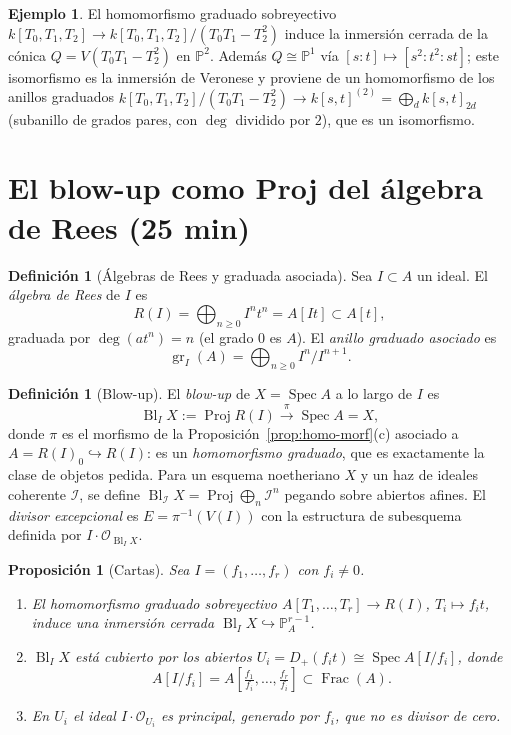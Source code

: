 \documentclass[11pt,a4paper]{article}
\newcommand{\Spec}{\operatorname{Spec}}
\newcommand{\Proj}{\operatorname{Proj}}
\newcommand{\Bl}{\operatorname{Bl}}
\newcommand{\gr}{\operatorname{gr}}
\newcommand{\PP}{\mathbb{P}}
\newcommand{\cO}{\mathcal{O}}
\newcommand{\Frac}{\operatorname{Frac}}
\theoremstyle{plain}
\newtheorem{proposicion}[teorema]{Proposición}
\theoremstyle{definition}
\newtheorem{definicion}[teorema]{Definición}
\newtheorem{ejemplo}[teorema]{Ejemplo}
\theoremstyle{remark}
\begin{document}
\begin{ejemplo}
El homomorfismo graduado sobreyectivo $k[T_0,T_1,T_2]\to k[T_0,T_1,T_2]/(T_0T_1-T_2^2)$ induce la inmersión cerrada de la cónica $Q=V(T_0T_1-T_2^2)$ en $\PP^2$. Además $Q\cong\PP^1$ vía $[s:t]\mapsto[s^2:t^2:st]$; este isomorfismo es la inmersión de Veronese y proviene de un homomorfismo de los anillos graduados $k[T_0,T_1,T_2]/(T_0T_1-T_2^2)\to k[s,t]^{(2)}=\bigoplus_d k[s,t]_{2d}$ (subanillo de grados pares, con $\deg$ dividido por $2$), que es un isomorfismo.
\end{ejemplo}

\section{El blow-up como Proj del álgebra de Rees (25 min)}

\begin{definicion}[Álgebras de Rees y graduada asociada]
Sea $I\subset A$ un ideal. El \emph{álgebra de Rees} de $I$ es
\[
R(I)=\bigoplus_{n\ge0}I^n t^n=A[It]\subset A[t],
\]
graduada por $\deg(at^n)=n$ (el grado $0$ es $A$). El \emph{anillo graduado asociado} es
\[
\gr_I(A)=\bigoplus_{n\ge0}I^n/I^{n+1}.
\]
\end{definicion}

\begin{definicion}[Blow-up]
El \emph{blow-up} de $X=\Spec A$ a lo largo de $I$ es
\[
\Bl_I X:=\Proj R(I)\xrightarrow{\ \pi\ }\Spec A=X,
\]
donde $\pi$ es el morfismo de la Proposición~\ref{prop:homo-morf}(c) asociado a $A=R(I)_0\hookrightarrow R(I)$: es un \emph{homomorfismo graduado}, que es exactamente la clase de objetos pedida. Para un esquema noetheriano $X$ y un haz de ideales coherente $\mathcal I$, se define $\Bl_{\mathcal I}X=\Proj\bigoplus_n\mathcal I^n$ pegando sobre abiertos afines. El \emph{divisor excepcional} es $E=\pi^{-1}(V(I))$ con la estructura de subesquema definida por $I\cdot\cO_{\Bl_IX}$.
\end{definicion}

\begin{proposicion}[Cartas]\label{prop:cartas}
Sea $I=(f_1,\dots,f_r)$ con $f_i\neq 0$.
\begin{enumerate}[label=(\alph*)]
\item El homomorfismo graduado sobreyectivo $A[T_1,\dots,T_r]\to R(I)$, $T_i\mapsto f_it$, induce una inmersión cerrada $\Bl_IX\hookrightarrow\PP^{r-1}_A$.
\item $\Bl_IX$ está cubierto por los abiertos $U_i=D_+(f_it)\cong\Spec A[I/f_i]$, donde
\[
A[I/f_i]=A\!\left[\tfrac{f_1}{f_i},\dots,\tfrac{f_r}{f_i}\right]\subset\Frac(A).
\]
\item En $U_i$ el ideal $I\cdot\cO_{U_i}$ es principal, generado por $f_i$, que no es divisor de cero.
\end{enumerate}
\end{proposicion}
\end{document}
